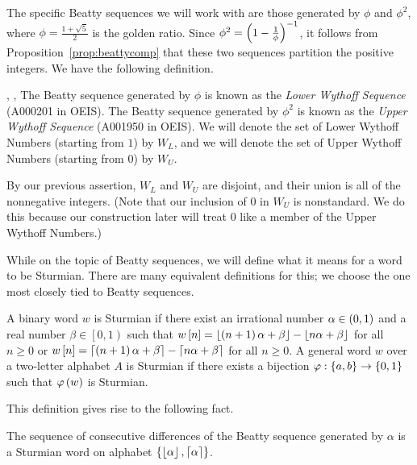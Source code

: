 \documentclass[english,12pt]{article}
\begin{document}
The specific Beatty sequences we will work with are those generated by $\phi$ and $\phi^2$, where $\phi=\frac{1+\sqrt{5}}{2}$ is the golden ratio.  Since $\phi^2=\left(1-\frac{1}{\phi}\right)^{-1}$, it follows from Proposition~\ref{prop:beattycomp} that these two sequences partition the positive integers.  We have the following definition.
\begin{defin}\label{def:wyt}\cite{rs}, \cite{oeis201}, \cite{oeis1950}
The Beatty sequence generated by $\phi$ is known as the \emph{Lower Wythoff Sequence} (A000201 in OEIS).  The Beatty sequence generated by $\phi^2$ is known as the \emph{Upper Wythoff Sequence} (A001950 in OEIS).  We will denote the set of Lower Wythoff Numbers (starting from $1$) by $W_L$, and we will denote the set of Upper Wythoff Numbers (starting from $0$) by $W_U$.
\end{defin}
By our previous assertion, $W_L$ and $W_U$ are disjoint, and their union is all of the nonnegative integers.  (Note that our inclusion of $0$ in $W_U$ is nonstandard.  We do this because our construction later will treat $0$ like a member of the Upper Wythoff Numbers.)

While on the topic of Beatty sequences, we will define what it means for a word to be Sturmian.  There are many equivalent definitions for this; we choose the one most closely tied to Beatty sequences.
\begin{defin}\label{def:sturm}\cite{bal}
A binary word $w$ is Sturmian if there exist an irrational number $\alpha\in\left(0,1\right)$ and a real number $\beta\in\left[0,1\right)$ such that $w\left[n\right]=\left\lfloor\left(n+1\right)\alpha+\beta\right\rfloor-\left\lfloor n\alpha+\beta\right\rfloor$ for all $n\geq0$ or $w\left[n\right]=\left\lceil\left(n+1\right)\alpha+\beta\right\rceil-\left\lceil n\alpha+\beta\right\rceil$ for all $n\geq0$.  A general word $w$ over a two-letter alphabet $A$ is Sturmian if there exists a bijection $\varphi:\left\{a,b\right\}\to\left\{0,1\right\}$ such that $\varphi\left(w\right)$ is Sturmian.
\end{defin}
This definition gives rise to the following fact.
\begin{prop}\label{prop:beattysturm}\cite{cass}
The sequence of consecutive differences of the Beatty sequence generated by $\alpha$ is a Sturmian word on alphabet $\left\{\left\lfloor\alpha\right\rfloor,\left\lceil\alpha\right\rceil\right\}$.
\end{prop}
\end{document}
